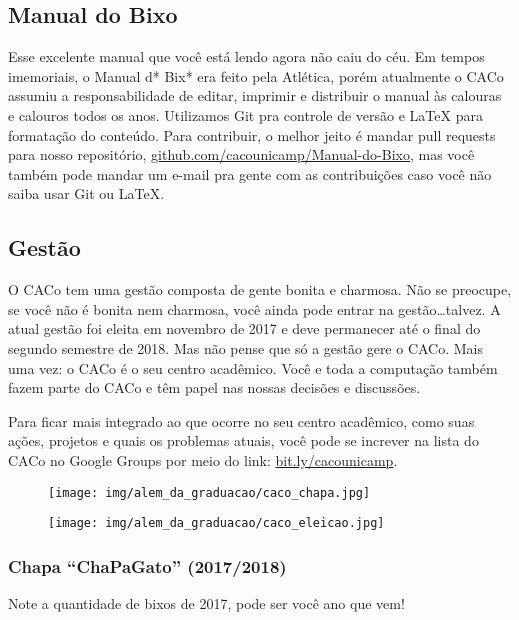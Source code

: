 \subsection{Manual do Bixo}

Esse excelente manual que você está lendo agora não caiu do céu. Em tempos
imemoriais, o Manual d* Bix* era feito pela Atlética, porém atualmente o CACo
assumiu a responsabilidade de editar, imprimir e distribuir o manual às
calouras e calouros todos os anos. Utilizamos Git pra controle de versão e
{\LaTeX} para formatação do conteúdo. Para contribuir, o melhor jeito é mandar
pull requests para nosso repositório,
\url{github.com/cacounicamp/Manual-do-Bixo}, mas você também pode mandar um
e-mail pra gente com as contribuições caso você não saiba usar Git ou \LaTeX.

\subsection{Gestão}

O CACo tem uma gestão composta de gente bonita e charmosa. Não se preocupe, se
você não é bonita nem charmosa, você ainda pode entrar na gestão\dots talvez. A
atual gestão foi eleita em novembro de 2017 e deve permanecer até o final do
segundo semestre de 2018. Mas não pense que só a gestão gere o CACo. Mais uma
vez: o CACo é o seu centro acadêmico. Você e toda a computação também fazem
parte do CACo e têm papel nas nossas decisões e discussões.

Para ficar mais integrado ao que ocorre no seu centro acadêmico, como suas
ações, projetos e quais os problemas atuais, você pode se increver na lista do
CACo no Google Groups por meio do link:
\url{bit.ly/cacounicamp}.

\begin{figure}[H]
  \centering
  \texttt{[image: img/alem\_da\_graduacao/caco\_chapa.jpg]}
\end{figure}

\begin{figure}[H]
  \centering
  \texttt{[image: img/alem\_da\_graduacao/caco\_eleicao.jpg]}
\end{figure}

\subsubsection{Chapa ``ChaPaGato'' (2017/2018)}

Note a quantidade de bixos de 2017, pode ser você ano que vem!

